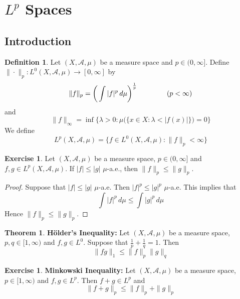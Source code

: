 \documentclass[12pt]{amsart}
\theoremstyle{definition}
\newtheorem{defn}[definition]{Definition}
\newtheorem{thm}[definition]{Theorem}
\newtheorem{ex}[definition]{Exercise}
\newcommand{\lam}{\lambda}
\newcommand{\MA}{\mathcal{A}}
\newcommand{\dmu}{\, d \mu}
\newcommand{\lex}[1]{\label{ex:#1}}
\newcommand{\ld}[1]{\label{defn:#1}}
\begin{document}
	
	
	
	
	
	
	
	
	
	
	
	
	
	
	
	
	
	
	
	
	
	
	
	\newpage
	\section{$L^{p}$ Spaces}
	
	\subsection{Introduction}
	
	\begin{defn} \ld{00000} 
		Let $(X, \MA, \mu)$ be a measure space and $p \in (0, \infty]$. Define $  \| \cdot \|_p : L^0(X, \MA, \mu) \rightarrow [0, \infty]$ by $$\|f \|_p = \bigg(\int | f |^p \dmu \bigg)^{\frac{1}{p}} \hspace{1.5cm}( p < \infty)$$ 
		and 
		$$\|f \|_{\infty} = \inf \bigg \{\lam >0: \mu\big(\{x \in X: \lam < | f(x) |  \}\big) = 0 \bigg \} $$
		We define $$L^p(X, \MA, \mu) =  \{f \in L^0(X, \MA, \mu): \|f \|_p < \infty \}$$
	\end{defn}
	
	\begin{ex} \lex{00000} 
	Let $(X, \MA, \mu)$ be a measure space, $p \in (0, \infty]$ and $f,g \in L^p(X, \MA, \mu)$. If $|f| \leq |g|$ $\mu$-a.e., then $\|f\|_p \leq \|g\|_p$.
	\end{ex}
	
	\begin{proof}
	Suppose that $|f| \leq |g|$ $\mu$-a.e. Then $|f|^p \leq |g|^p$ $\mu$-a.e. This implies that $$\int |f|^p \dmu \leq  \int |g|^p \dmu$$ Hence $\|f\|_p \leq \|g\|_p$.
	\end{proof}
	
	\begin{thm}{\textbf{Hölder's Inequality:}}
		Let $(X, \MA, \mu)$ be a measure space, $p,q \in [1, \infty)$ and $f,g \in L^0$. Suppose that $\frac{1}{p} + \frac{1}{q} = 1$. Then $$\|fg\|_1 \leq \|f \|_p \|g \|_q$$
	\end{thm}
	
	\begin{ex} \lex{00000} \textbf{Minkowski Inequality:}
		Let $(X, \MA, \mu)$ be a measure space, $p \in [1, \infty)$ and $f,g \in L^p$. Then $f+g \in L^p$ and $$\|f+g\|_p  \leq \|f\|_p + \|g\|_p $$
	\end{ex}
	
\end{document}
